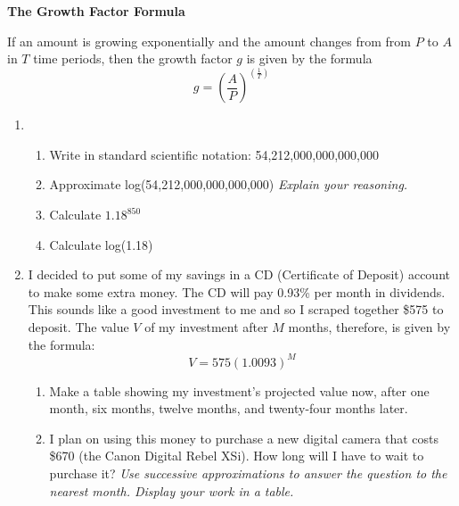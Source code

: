 \documentclass[12pt]{article}
\begin{document}
 \vspace{.2in}
 
 \begin{center}
\textbf{The Growth Factor Formula}
\vspace{.1in}

If an amount is growing exponentially and the amount changes from from $P$ to $A$ \\ in $T$ time periods, then the growth factor $g$ is given by the formula $$g=\left(\frac{A}{P}\right)^{\left(\frac{1}{T}\right)}$$

 \end{center}

\hrulefill

\newpage

\begin{enumerate}
\item \begin{enumerate}
\item Write in standard scientific notation:  54,212,000,000,000,000
\vfill
\item Approximate log(54,212,000,000,000,000)  \emph{Explain your reasoning.}
\vfill
\item Calculate $1.18^{850}$
\vfill
\item Calculate log(1.18)
\vfill
\end{enumerate}

\newpage
\item I decided to put some of my savings in a CD (Certificate of Deposit) account to make some extra money.  The CD will pay 0.93\% per month in dividends.  This sounds like a good investment to me and so I scraped together \$575 to deposit.  The value $V$ of my investment after $M$ months, therefore, is given by the formula: $$V=575(1.0093)^M$$

\begin{enumerate}
\item Make a table showing my investment's projected value now, after one month, six months, twelve months, and twenty-four months later.
\vfill
\item I plan on using this money to purchase a new digital camera that costs \$670 (the Canon Digital Rebel XSi).  How long will I have to wait to purchase it?  \emph{Use successive approximations to answer the question to the nearest month.  Display your work in a table.}
\vfill
\vfill
\vfill
\end{enumerate}


\end{enumerate}
\end{document}
